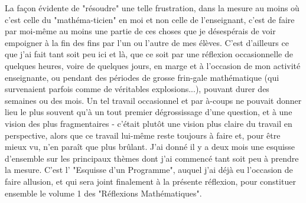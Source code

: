 La façon évidente de "résoudre" une telle frustration, dans la mesure au moins où c'est celle du "mathéma-ticien" en moi et non celle de l'enseignant, c'est de faire par moi-même au moins une partie de ces choses que je désespérais de voir empoigner à la fin des fins par l'un ou l'autre de mes élèves. C'est d'ailleurs ce que j'ai fait tant soit peu ici et là, que ce soit par une réflexion occasionnelle de quelques heures, voire de quelques jours, en marge et à l'occasion de mon activité enseignante, ou pendant des périodes de grosse frin-gale mathématique (qui survenaient parfois comme de véritables explosions...), pouvant durer des semaines ou des mois. Un tel travail occasionnel et par à-coups ne pouvait donner lieu le plus souvent qu’à un tout premier dégrossissage d'une question, et à une vision des plus fragmentaires - c'était plutôt une vision plus claire du travail en perspective, alors que ce travail lui-même reste toujours à faire et, pour être mieux vu, n'en paraît que plus brûlant. J'ai donné il y a deux mois une esquisse d'ensemble sur les principaux thèmes dont j'ai commencé tant soit peu à prendre la mesure. C'est l' "Esquisse d'un Programme", auquel j'ai déjà eu l'occasion de faire allusion, et qui sera joint finalement à la présente réflexion, pour constituer ensemble le volume 1 des "Réflexions Mathématiques".

